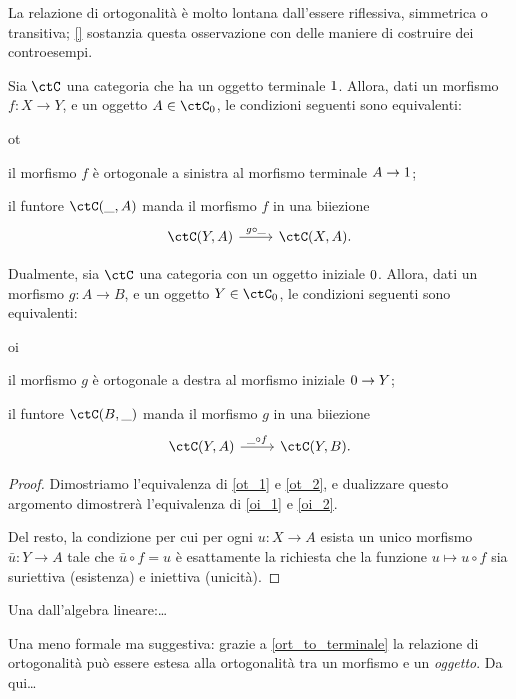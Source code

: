 La relazione di ortogonalità è molto lontana dall'essere riflessiva, simmetrica o transitiva; \ref{} sostanzia questa osservazione con delle maniere di costruire dei controesempi.
\begin{proposition}\label{ort_to_terminale}
  Sia $\ctC$ una categoria che ha un oggetto terminale $1$. Allora, dati un morfismo $f : X\to Y$, e un oggetto $A\in \ctC_0$, le condizioni seguenti sono equivalenti: 
  \begin{enumtag}{ot}
  \item\label{ot_1} il morfismo $f$ è ortogonale a sinistra al morfismo terminale $A\to 1$;
  \item\label{ot_2} il funtore $\ctC(\_,A)$ manda il morfismo $f$ in una biiezione 
      \[\begin{tikzcd}
        \ctC(Y,A) \ar[r, "{g\circ \_}"] & \ctC(X,A).
    \end{tikzcd}\]
  \end{enumtag}
  Dualmente, sia $\ctC$ una categoria con un oggetto iniziale $0$. Allora, dati un morfismo $g : A\to B$, e un oggetto $Y\in\ctC_0$, le condizioni seguenti sono equivalenti:
  \begin{enumtag}{oi}
  \item \label{oi_1} il morfismo $g$ è ortogonale a destra al morfismo iniziale $0\to Y$;
  \item \label{oi_2} il funtore $\ctC(B,\_)$ manda il morfismo $g$ in una biiezione 
      \[\begin{tikzcd}
        \ctC(Y,A) \ar[r, "{\_\circ f}"] & \ctC(Y,B).
    \end{tikzcd}\]
  \end{enumtag}
\end{proposition}
\begin{proof}
  Dimostriamo l'equivalenza di \ref{ot_1} e \ref{ot_2}, e dualizzare questo argomento dimostrerà l'equivalenza di \ref{oi_1} e \ref{oi_2}. 

  Del resto, la condizione per cui per ogni $u : X\to A$ esista un unico morfismo $\bar u : Y\to A$ tale che $\bar u\circ f = u$ è esattamente la richiesta che la funzione $u\mapsto u\circ f$ sia suriettiva (esistenza) e iniettiva (unicità).
\end{proof}
\begin{remark}\label{perche_ortogonale}

  Una dall'algebra lineare:\dots

  Una meno formale ma suggestiva: grazie a \ref{ort_to_terminale} la relazione di ortogonalità può essere estesa alla ortogonalità tra un morfismo e un \emph{oggetto}. Da qui\dots
\end{remark}
